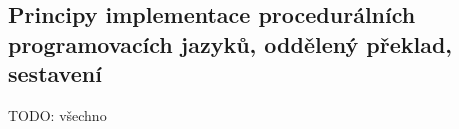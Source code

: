 \subsection{Principy implementace procedurálních programovacích jazyků, oddělený překlad, sestavení}

TODO: všechno
